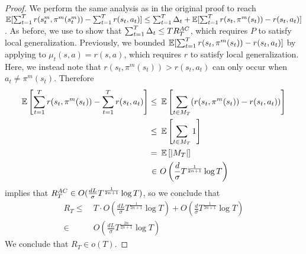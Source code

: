 \begin{proof}
We perform the same analysis as in the original proof to reach $\operatorname*{\mathbb{E}}[\sum_{t=1}^Tr(s_t^m, \pi^m(s_t^m)) - \sum_{t=1}^T r(s_t, a_t)] \le \sum_{t=1}^T \Delta_t+\operatorname*{\mathbb{E}} [\sum_{t=1}^T r(s_t, \pi^m(s_t)) - r(s_t, a_t)]$. As before, we use  to show that $\sum_{t=1}^T \Delta_t \le TR_T^{AC}$, which requires $P$ to satisfy local generalization. Previously, we bounded $\operatorname*{\mathbb{E}} [\sum_{t=1}^T r(s_t, \pi^m(s_t)) - r(s_t, a_t)]$ by applying  to $\mu_t(s,a) = r(s,a)$, which requires $r$ to satisfy local generalization. Here, we instead note that $r(s_t, \pi^m(s_t)) > r(s_t, a_t)$ can only occur when $a_t \ne \pi^m(s_t)$. Therefore
\begin{align*}
\operatorname*{\mathbb{E}} \left[\sum_{t=1}^T r(s_t, \pi^m(s_t)) -\sum_{t=1}^T r(s_t, a_t)\right] \le&\ \operatorname*{\mathbb{E}} \left[\sum_{t \in M_T} (r(s_t, \pi^m(s_t)) - r(s_t, a_t))\right]\\
\le&\ \operatorname*{\mathbb{E}} \left[\sum_{t \in M_T} 1\right]\\
=&\ \operatorname*{\mathbb{E}} \left[|M_T|\right]\\
\in&\ O\left(\frac{d}{\sigma} T^\frac{1}{2n+1} \log T\right)
\end{align*}
 implies that $R_T^{AC} \in O(\frac{dL}{\sigma} T^\frac{1}{2n+1} \log T)$, so we conclude that
\begin{align*}
R_T \le&\ T \cdot O\left(\frac{dL}{\sigma} T^\frac{1}{2n+1} \log T\right) + O\left(\frac{d}{\sigma} T^\frac{1}{2n+1} \log T\right)\\
\in&\ O\left(\frac{dL}{\sigma} T^\frac{2n}{2n+1} \log T\right)
\end{align*}
We conclude that $R_T \in o(T)$.
\end{proof}